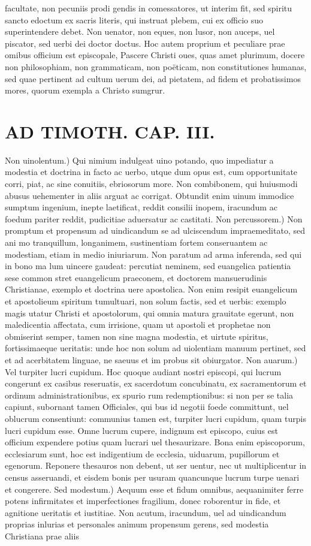 \documentclass{article}
\begin{document}
\begin{pages}
facultate, non pecuniis prodi gendis in comessatores, ut interim fit, sed spiritu sancto edoctum ex sacris literis, qui instruat plebem, cui ex officio suo superintendere debet. Non uenator, non eques, non lusor, non auceps, uel piscator, sed uerbi dei doctor doctus. Hoc autem proprium et peculiare prae omibus officium est episcopale, Pascere Christi oues, quas amet plurimum, docere non philosophiam, non grammaticam, non poëticam, non constitutiones humanas, sed quae pertinent ad cultum uerum dei, ad pietatem, ad fidem et probatissimos mores, quorum exempla a Christo sumgrur.  \pend
\section*{AD TIMOTH. CAP. III. }
\marginpar{[ p.497 ]}\pstart Non uinolentum.) Qui nimium indulgeat uino potando, quo impediatur a modestia et doctrina in facto ac uerbo, utque dum opus est, cum opportunitate corri, piat, ac sine conuitiis, ebriosorum more. Non combibonem, qui huiusmodi abusus uehementer in aliis arguat ac corrigat. Obtundit enim uinum immodice sumptum ingenium, inepte laetificat, reddit consilii inopem, iracundum ac foedum pariter reddit, pudicitiae aduersatur ac castitati. Non percussorem.) Non promptum et propensum ad uindicandum se ad ulciscendum impraemeditato, sed ani mo tranquillum, longanimem, sustinentiam fortem conseruantem ac modestiam, etiam in medio iniuriarum. Non paratum ad arma inferenda, sed qui in bono ma lum uincere gaudeat: percutiat neminem, sed euangelica patientia sese common stret euangelicum praeconem, et doctorem mansuerudinis Christianae, exemplo et doctrina uere apostolica. Non enim resipit euangelicum et apostolieum spiritum tumultuari, non solum factis, sed et uerbis: exemplo magis utatur Christi et apostolorum, qui omnia matura grauitate egerunt, non maledicentia affectata, cum irrisione, quam ut apostoli et prophetae non obmiserint semper, tamen non sine magna modestia, et uirtute spiritus, fortissimaeque ueritatis: unde hoc non solum ad uiolentiam manuum pertinet, sed et ad acerbitatem linguae, ne saeuus et im probus sit obiurgator. Non auarum.) Vel turpiter lucri cupidum. Hoc quoque  audiant nostri episcopi, qui lucrum congerunt ex casibus reseruatis, ex sacerdotum concubinatu, ex sacramentorum et ordinum administrationibus, ex spurio rum redemptionibus: si non per se talia capiunt, subornant tamen Officiales, qui bus id negotii foede committunt, uel oblucrum consentiunt: communius tamen est, turpiter lucri cupidum, quam turpis lucri cupidum esse. Omne lucrum cupere, indignum est episcopo, cuius est officium expendere potius quam lucrari uel thesaurizare. Bona enim episcoporum, ecclesiarum sunt, hoc est indigentium de ecclesia, uiduarum, pupillorum et egenorum. Reponere thesauros non debent, ut ser uentur, nec ut multiplicentur in census asseruandi, et eisdem bonis per usuram quancunque lucrum turpe uenari et congerere. Sed modestum.) Aequum esse et fidum omnibus, aequanimiter ferre potens infirmitates et imperfectiones fragilium, donec roborentur in fide, et agnitione ueritatis et iustitiae. Non acutum, iracundum, uel ad uindicandum proprias inlurias et personales animum propensum gerens, sed modestia Christiana prae aliis 
\end{pages}
\end{document}
